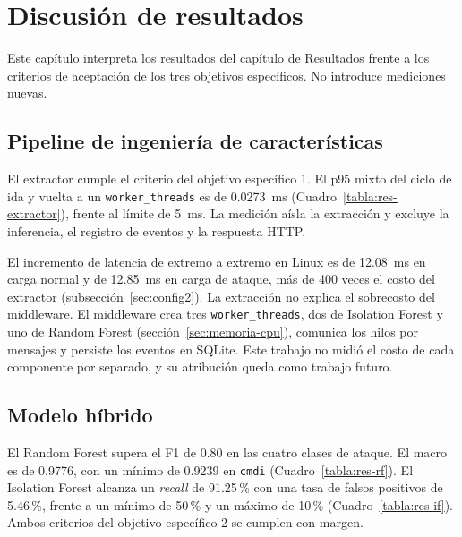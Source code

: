 \chapter{Discusión de resultados}\label{cap:discusion}

Este capítulo interpreta los resultados del capítulo de Resultados frente a los criterios de aceptación de los tres objetivos específicos. No introduce mediciones nuevas.

\section{Pipeline de ingeniería de características}

El extractor cumple el criterio del objetivo específico 1. El p95 mixto del ciclo de ida y vuelta a un \texttt{worker\_threads} es de 0.0273~ms (Cuadro~\ref{tabla:res-extractor}), frente al límite de 5~ms. La medición aísla la extracción y excluye la inferencia, el registro de eventos y la respuesta HTTP.

El incremento de latencia de extremo a extremo en Linux es de 12.08~ms en carga normal y de 12.85~ms en carga de ataque, más de 400 veces el costo del extractor (subsección~\ref{sec:config2}). La extracción no explica el sobrecosto del middleware. El middleware crea tres \texttt{worker\_threads}, dos de Isolation Forest y uno de Random Forest (sección~\ref{sec:memoria-cpu}), comunica los hilos por mensajes y persiste los eventos en SQLite.
Este trabajo no midió el costo de cada componente por separado, y su atribución queda como trabajo futuro.

\section{Modelo híbrido}

El Random Forest supera el F1 de 0.80 en las cuatro clases de ataque. El macro es de 0.9776, con un mínimo de 0.9239 en \texttt{cmdi} (Cuadro~\ref{tabla:res-rf}). El Isolation Forest alcanza un \textit{recall} de 91.25\,\% con una tasa de falsos positivos de 5.46\,\%, frente a un mínimo de 50\,\% y un máximo de 10\,\% (Cuadro~\ref{tabla:res-if}). Ambos criterios del objetivo específico 2 se cumplen con margen.

